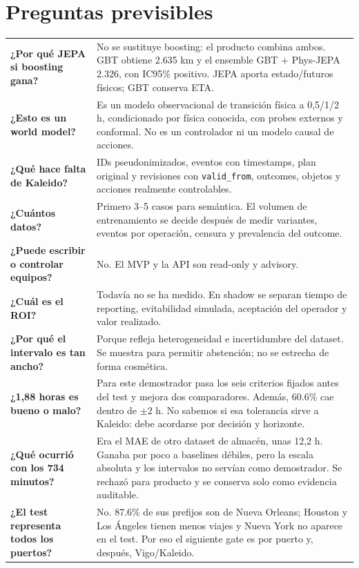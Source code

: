 \documentclass[11pt,a4paper]{article}
\begin{document}
\section{Preguntas previsibles}
\begin{tabularx}{\linewidth}{@{}>{\raggedright\arraybackslash\bfseries}p{4.2cm}X@{}}\toprule
¿Por qué JEPA si boosting gana? & No se sustituye boosting: el producto combina ambos. GBT
obtiene 2.635 km y el ensemble GBT + Phys-JEPA 2.326, con IC95\% positivo.
JEPA aporta estado/futuros físicos; GBT conserva ETA. \\
¿Esto es un world model? & Es un modelo observacional de transición física a 0,5/1/2 h,
condicionado por física conocida, con probes externos y conformal. No es un controlador ni
un modelo causal de acciones. \\
¿Qué hace falta de Kaleido? & IDs pseudonimizados, eventos con timestamps, plan original y
revisiones con \texttt{valid\_from}, outcomes, objetos y acciones realmente controlables. \\
¿Cuántos datos? & Primero 3--5 casos para semántica. El volumen de entrenamiento se decide
después de medir variantes, eventos por operación, censura y prevalencia del outcome. \\
¿Puede escribir o controlar equipos? & No. El MVP y la API son read-only y advisory. \\
¿Cuál es el ROI? & Todavía no se ha medido. En shadow se separan tiempo de reporting,
evitabilidad simulada, aceptación del operador y valor realizado. \\
¿Por qué el intervalo es tan ancho? & Porque refleja heterogeneidad e incertidumbre del dataset.
Se muestra para permitir abstención; no se estrecha de forma cosmética. \\
¿1,88 horas es bueno o malo? & Para este demostrador pasa los seis criterios fijados antes
del test y mejora dos comparadores. Además, 60.6\% cae dentro de $\pm$2 h. No
sabemos si esa tolerancia sirve a Kaleido: debe acordarse por decisión y horizonte. \\
¿Qué ocurrió con los 734 minutos? & Era el MAE de otro dataset de almacén, unas 12,2 h.
Ganaba por poco a baselines débiles, pero la escala absoluta y los intervalos no servían
como demostrador. Se rechazó para producto y se conserva solo como evidencia auditable. \\
¿El test representa todos los puertos? & No. 87.6\% de sus prefijos son de
Nueva Orleans; Houston y Los Ángeles tienen menos viajes y Nueva York no aparece en el test.
Por eso el siguiente gate es por puerto y, después, Vigo/Kaleido. \\
\bottomrule\end{tabularx}
\end{document}
